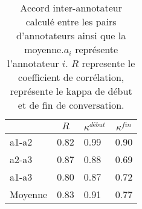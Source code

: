 \begin{table}[th]
    \centering
    \begin{tabular}{| p{1cm} | l | l l |}
    \hline
      & \multicolumn{1}{c|}{$R$} & \multicolumn{1}{c}{$\kappa^{début}$} & \multicolumn{1}{c}{$\kappa^{fin}$}\\
      \hline
      a1-a2   &0.82   &0.99   &0.90   \\
      a2-a3   &0.87   &0.88   &0.69   \\
      a1-a3   &0.80   &0.87   &0.72   \\
      \hline
      Moyenne &0.83   &0.91   &0.77   \\
      \hline
    \end{tabular}
    \caption{Accord inter-annotateur calculé entre les pairs d'annotateurs ainsi que la moyenne.$a_i$ représente l'annotateur $i$. $R$ represente le coefficient de corrélation, \kappa représente le kappa de début et de fin de conversation.}
    \label{tab:accordInterAnnot}
  \end{table}
